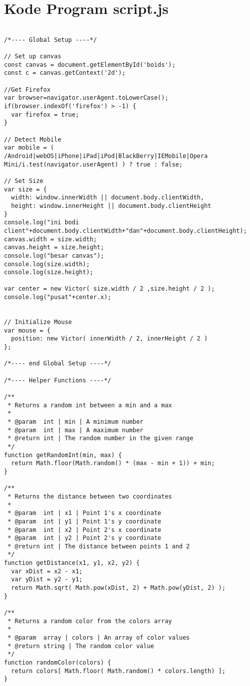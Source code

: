 \section{Kode Program script.js}
\begin{lstlisting}

/*---- Global Setup ----*/

// Set up canvas
const canvas = document.getElementById('boids');
const c = canvas.getContext('2d');

//Get Firefox
var browser=navigator.userAgent.toLowerCase();
if(browser.indexOf('firefox') > -1) {
  var firefox = true;
}

// Detect Mobile
var mobile = ( /Android|webOS|iPhone|iPad|iPod|BlackBerry|IEMobile|Opera Mini/i.test(navigator.userAgent) ) ? true : false;

// Set Size
var size = {
  width: window.innerWidth || document.body.clientWidth,
  height: window.innerHeight || document.body.clientHeight
}
console.log("ini bodi client"+document.body.clientWidth+"dan"+document.body.clientHeight);
canvas.width = size.width;
canvas.height = size.height;
console.log("besar canvas");
console.log(size.width);
console.log(size.height);

var center = new Victor( size.width / 2 ,size.height / 2 );
console.log("pusat"+center.x);


// Initialize Mouse
var mouse = {
  position: new Victor( innerWidth / 2, innerHeight / 2 )
};

/*---- end Global Setup ----*/

/*---- Helper Functions ----*/

/**
 * Returns a random int between a min and a max
 *
 * @param  int | min | A minimum number
 * @param  int | max | A maximum number
 * @return int | The random number in the given range
 */
function getRandomInt(min, max) {
  return Math.floor(Math.random() * (max - min + 1)) + min;
}

/**
 * Returns the distance between two coordinates
 *
 * @param  int | x1 | Point 1's x coordinate
 * @param  int | y1 | Point 1's y coordinate
 * @param  int | x2 | Point 2's x coordinate
 * @param  int | y2 | Point 2's y coordinate
 * @return int | The distance between points 1 and 2
 */
function getDistance(x1, y1, x2, y2) {
  var xDist = x2 - x1;
  var yDist = y2 - y1;
  return Math.sqrt( Math.pow(xDist, 2) + Math.pow(yDist, 2) );
}

/**
 * Returns a random color from the colors array
 *
 * @param  array | colors | An array of color values
 * @return string | The random color value
 */
function randomColor(colors) {
  return colors[ Math.floor( Math.random() * colors.length) ];
}


\end{lstlisting}
